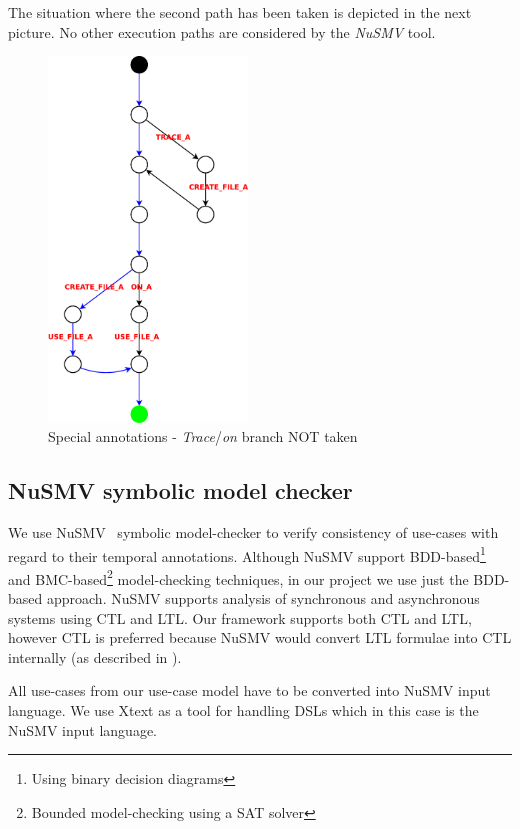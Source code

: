 The situation where the second path has been taken is depicted in the next picture. No other execution paths are considered by the
\emph{NuSMV} tool.

\newpage

\begin{figure}[ht]
  \centering
  \includegraphics[width=150pt]{images/traceTest_path_not_taken}
  \caption{Special annotations - \emph{Trace}/\emph{on} branch NOT taken}
  \label{fig:traceTestNotTaken}
\end{figure}

\subsection{NuSMV symbolic model checker}

We use NuSMV~\cite{NuSMV-CAV02,NuSMV-frocos02} symbolic model-checker to verify consistency of use-cases with regard to their temporal annotations.
Although NuSMV support BDD-based\footnote{Using binary decision diagrams} and BMC-based\footnote{Bounded model-checking using a SAT solver} model-checking techniques, in our project we use just the BDD-based approach.
NuSMV supports analysis of synchronous and asynchronous systems using \ac{CTL} and \ac{LTL}.
Our framework supports both \ac{CTL} and \ac{LTL}, however \ac{CTL} is preferred because NuSMV would convert LTL formulae into CTL internally (as described in \cite{NuSMV-ltl-fmsd97}).

All use-cases from our use-case model have to be converted into NuSMV input language.
We use Xtext\cite{Xtext-website} as a tool for handling \acp{DSL} which in this case is the NuSMV input language.

